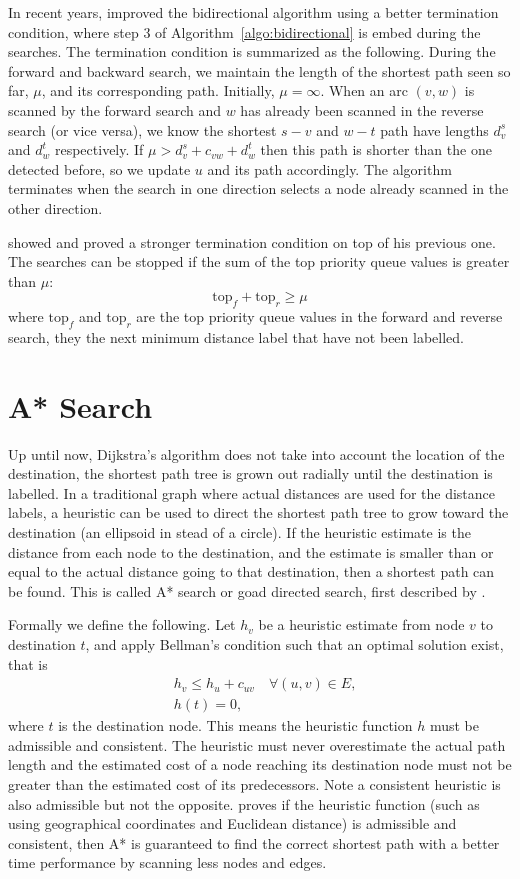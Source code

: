 In recent years,
\citet{Goldberg05} improved the bidirectional algorithm using a better termination condition,
where step 3 of Algorithm~\ref{algo:bidirectional} is embed during the searches.
The termination condition is summarized as the following.
During the forward and backward search,
we maintain the length of the shortest path seen so far, $\mu$, and its corresponding path. Initially, $\mu = \infty$.
When an arc $(v,w)$ is scanned by the forward search and $w$ has already been scanned in the reverse search (or vice versa),
we know the shortest $s-v$ and $w-t$ path have lengths $d_v^s$ and $d_w^t$ respectively.
If $\mu > d_v^s + c_{vw} + d_w^t$ then this path is shorter than the one detected before, 
so we update $u$ and its path accordingly.
The algorithm terminates when the search in one direction selects a node already scanned in the other direction.

\citet{GoldbergEPP} showed and proved a stronger termination condition on top of his previous one.
The searches can be stopped if the sum of the top priority queue values is greater than $\mu$:
\[
    \text{top}_f + \text{top}_r \geq \mu
\]
where $\text{top}_f$ and $\text{top}_r$ are the top priority queue values in the forward and reverse search, they the next minimum distance label that have not been labelled.

\section{A* Search}
Up until now,
Dijkstra's algorithm does not take into account the location of the destination,
the shortest path tree is grown out radially until the destination is labelled.
In a traditional graph where actual distances are used for the distance labels,
a heuristic can be used to direct the shortest path tree to grow toward the destination (an ellipsoid in stead of a circle).
If the heuristic estimate is the distance from each node to the destination,
and the estimate is smaller than or equal to the actual distance going to that destination,
then a shortest path can be found. This is called A* search or goad directed search, first described by \citet{Astar}.

Formally we define the following.
Let $h_v$ be a heuristic estimate from node $v$ to destination $t$,
and apply Bellman's condition such that an optimal solution exist, that is 
\begin{align}
    &h_v \leq h_u + c_{uv} \quad \forall(u,v) \in E, \\
    &h(t) = 0,
\end{align}
where $t$ is the destination node.
This means the heuristic function $h$ must be admissible and consistent.
The heuristic must never overestimate the actual path length and the estimated cost of a node reaching its destination node must not be greater than the estimated cost of its predecessors.
Note a consistent heuristic is also admissible but not the opposite.
\citet{Astar} proves if the heuristic function (such as using geographical coordinates and Euclidean distance) is admissible and consistent,
then A* is guaranteed to find the correct shortest path with a better time performance by scanning less nodes and edges.

